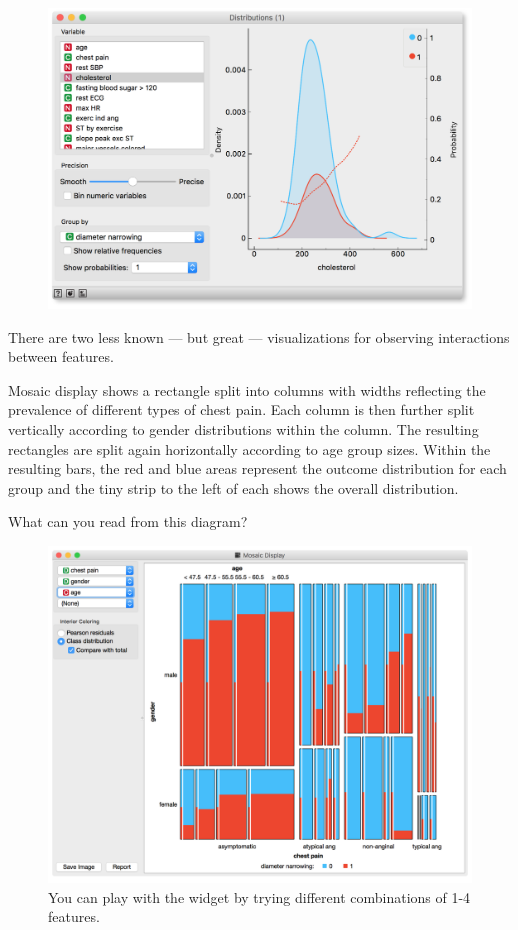 \begin{figure}[h]
  \flushright
  \includegraphics[width=115mm]{graphics/ch-basic_data_exploration/basic_data_exploration-fig5.png}
  \label{fig:basic_data_exploration-fig5}
\end{figure}

There are two less known — but great — visualizations for observing interactions between features. 

Mosaic display shows a rectangle split into columns with widths reflecting the prevalence of different types of chest pain. Each column is then further split vertically according to gender distributions within the column. The resulting rectangles are split again horizontally according to age group sizes. Within the resulting bars, the red and blue areas represent the outcome distribution for each group and the tiny strip to the left of each shows the overall distribution.

\newpage
What can you read from this diagram?

\begin{figure}[h]
  \centering
  \includegraphics[width=\linewidth]{graphics/ch-basic_data_exploration/basic_data_exploration-fig6.png}
  \caption{You can play with the widget by trying different combinations of 1-4 features.}
  \label{fig:basic_data_exploration-fig6}
\end{figure}

